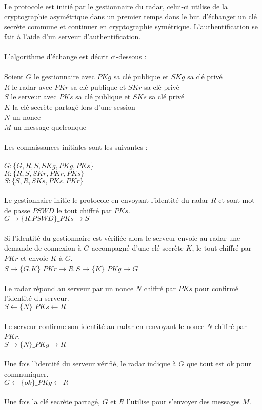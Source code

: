 \documentclass[]{scrartcl}
\begin{document}
Le protocole est initié par le gestionnaire du radar, celui-ci utilise de la cryptographie asymétrique dans un premier temps dans le but d'échanger un clé secrète commune et continuer en cryptographie symétrique. L'authentification se fait à l'aide d'un serveur d'authentification.
\\
\\
L'algorithme d'échange est décrit ci-dessous : 
\\
\\
Soient 
$G$ le gestionnaire avec $PKg$ sa clé publique et  $SKg$ sa clé privé
\\
$R$ le radar avec $PKr$ sa clé publique et  $SKr$ sa clé privé
\\
$S$ le serveur avec $PKs$ sa clé publique et  $SKs$ sa clé privé
\\
$K$ la clé secrète partagé lors d'une session
\\
$N$ un nonce
\\
$M$ un message quelconque
\\
\\
Les connaissances initiales sont les suivantes :
\\
\\
$G : \{G, R, S, SKg, PKg, PKs\}$
\\
$R : \{R, S, SKr, PKr, PKs\}$
\\
$S : \{S, R, SKs, PKs, PKr\}$
\\
\\
Le gestionnaire initie le protocole en envoyant l'identité du radar $R$ et sont mot de passe $PSWD$ le tout chiffré par $PKs$.
\\
$G \rightarrow \{R.PSWD\}\_PKs \longrightarrow S$
\\
\\
Si l'identité du gestionnaire est vérifiée alors le serveur envoie au radar une demande de connexion à $G$ accompagné d'une clé secrète $K$, le tout chiffré par $PKr$ et envoie $K$ à $G$.
\\
$S \rightarrow \{G.K\}\_PKr \longrightarrow R$
$S \rightarrow \{K\}\_PKg \longrightarrow G$
\\
\\
Le radar répond au serveur par un nonce $N$ chiffré par $PKs$ pour confirmé l'identité du serveur.
\\
$S \longleftarrow \{N\}\_PKs \leftarrow R$
\\
\\
Le serveur confirme son identité au radar en renvoyant le nonce $N$ chiffré par $PKr$.
\\
$S \rightarrow \{N\}\_PKg \longrightarrow R$
\\
\\
Une fois l'identité du serveur vérifié, le radar indique à $G$ que tout est ok pour communiquer.
\\
$G \longleftarrow \{ok\}\_PKg \leftarrow R$
\\
\\
Une fois la clé secrète partagé, $G$ et $R$ l'utilise pour s'envoyer des messages $M$.
\\
\end{document}

